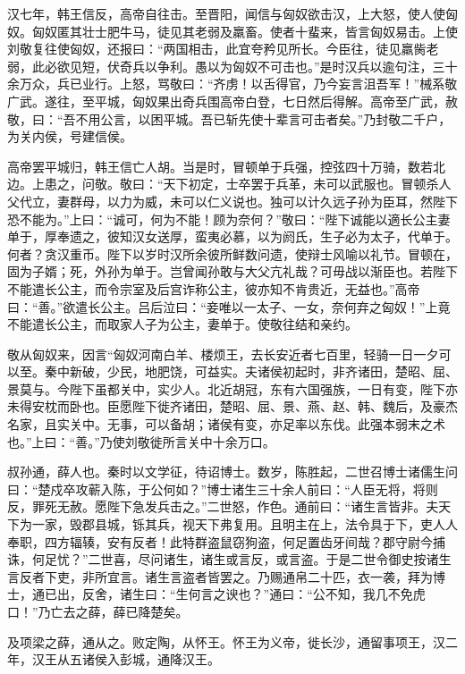 \documentclass[12pt,UTF8]{ctexbook}
\begin{document}
汉七年，韩王信反，高帝自往击。至晋阳，闻信与匈奴欲击汉，上大怒，使人使匈奴。匈奴匿其壮士肥牛马，徒见其老弱及羸畜。使者十蜚来，皆言匈奴易击。上使刘敬复往使匈奴，还报曰：“两国相击，此宜夸矜见所长。今臣往，徒见羸胔老弱，此必欲见短，伏奇兵以争利。愚以为匈奴不可击也。”是时汉兵以逾句注，三十余万众，兵已业行。上怒，骂敬曰：“齐虏！以舌得官，乃今妄言沮吾军！”械系敬广武。遂往，至平城，匈奴果出奇兵围高帝白登，七日然后得解。高帝至广武，赦敬，曰：“吾不用公言，以困平城。吾已斩先使十辈言可击者矣。”乃封敬二千户，为关内侯，号建信侯。



高帝罢平城归，韩王信亡人胡。当是时，冒顿单于兵强，控弦四十万骑，数若北边。上患之，问敬。敬曰：“天下初定，士卒罢于兵革，未可以武服也。冒顿杀人父代立，妻群母，以力为威，未可以仁义说也。独可以计久远子孙为臣耳，然陛下恐不能为。”上曰：“诚可，何为不能！顾为奈何？”敬曰：“陛下诚能以適长公主妻单于，厚奉遗之，彼知汉女送厚，蛮夷必慕，以为阏氏，生子必为太子，代单于。何者？贪汉重币。陛下以岁时汉所余彼所鲜数问遗，使辩士风喻以礼节。冒顿在，固为子婿；死，外孙为单于。岂曾闻孙敢与大父亢礼哉？可毋战以渐臣也。若陛下不能遣长公主，而令宗室及后宫诈称公主，彼亦知不肯贵近，无益也。”高帝曰：“善。”欲遣长公主。吕后泣曰：“妾唯以一太子、一女，奈何弃之匈奴！”上竟不能遣长公主，而取家人子为公主，妻单于。使敬往结和亲约。



敬从匈奴来，因言“匈奴河南白羊、楼烦王，去长安近者七百里，轻骑一日一夕可以至。秦中新破，少民，地肥饶，可益实。夫诸侯初起时，非齐诸田，楚昭、屈、景莫与。今陛下虽都关中，实少人。北近胡冠，东有六国强族，一日有变，陛下亦未得安枕而卧也。臣愿陛下徙齐诸田，楚昭、屈、景、燕、赵、韩、魏后，及豪杰名家，且实关中。无事，可以备胡；诸侯有变，亦足率以东伐。此强本弱末之术也。”上曰：“善。”乃使刘敬徙所言关中十余万口。



叔孙通，薛人也。秦时以文学征，待诏博士。数岁，陈胜起，二世召博士诸儒生问曰：“楚戍卒攻蕲入陈，于公何如？”博士诸生三十余人前曰：“人臣无将，将则反，罪死无赦。愿陛下急发兵击之。”二世怒，作色。通前曰：“诸生言皆非。夫天下为一家，毁郡县城，铄其兵，视天下弗复用。且明主在上，法令具于下，吏人人奉职，四方辐辏，安有反者！此特群盗鼠窃狗盗，何足置齿牙间哉？郡守尉今捕诛，何足忧？”二世喜，尽问诸生，诸生或言反，或言盗。于是二世令御史按诸生言反者下吏，非所宜言。诸生言盗者皆罢之。乃赐通帛二十匹，衣一袭，拜为博士，通已出，反舍，诸生曰：“生何言之谀也？”通曰：“公不知，我几不免虎口！”乃亡去之薛，薛已降楚矣。



及项梁之薛，通从之。败定陶，从怀王。怀王为义帝，徙长沙，通留事项王，汉二年，汉王从五诸侯入彭城，通降汉王。
\end{document}
